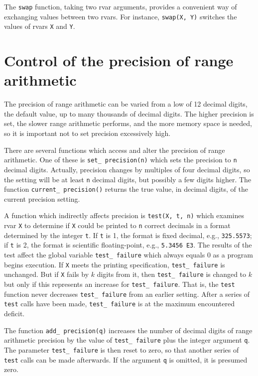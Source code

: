 The {\tt swap} function, taking two rvar arguments, provides a convenient
way of exchanging values between two rvars. For instance, {\tt swap(X, Y)}
switches the values of rvars {\tt X} and {\tt Y}.

\section{Control of the precision of range arithmetic}
The precision of range arithmetic can be varied from a low
of 12 decimal digits, the default value, up to many thousands of
decimal digits. The higher precision is set, the slower range arithmetic
performs, and the more memory space is needed, so
it is important not to set precision excessively high.

There are several functions which access and alter the precision of
range arithmetic. One of these is \hbox{\tt set\_ precision(n)} which sets
the precision to {\tt n} decimal digits. Actually, precision changes
by multiples of four decimal digits, so the setting will be at
least {\tt n} decimal digits, but possibly a few digits higher.
The function {\tt current\_ precision()} returns the true value,
in decimal digits, of the current precision setting.

A function which indirectly affects precision is
\hbox{\tt test(X, t, n)} which examines rvar {\tt X} to determine if
{\tt X} could be printed to {\tt n} correct decimals in a format
determined by the integer {\tt t}. If {\tt t} is 1, the format is
fixed decimal, e.g., \hbox{\tt 325.5573}; if {\tt t} is 2,
the format is scientific floating-point, e.g., \hbox{\tt 5.3456 E3}.
The results of the test affect the global variable \hbox{\tt test\_ failure}
which always equals 0 as a program begins execution. If {\tt X} meets
the printing specification, \hbox{\tt test\_ failure} is unchanged. 
But if {\tt X} fails by $k$ digits from it, then \hbox{\tt test\_ failure}
is changed to $k$ but only if this represents an increase for 
{\tt test\_ failure}. That is, the {\tt test} function never
decreases {\tt test\_ failure} from an earlier setting.
After a series of {\tt test} calls have been made, {\tt test\_ failure}
is at the maximum encountered deficit.

The function {\tt add\_ precision(q)} increases the number 
of decimal digits of range arithmetic precision by the value
of {\tt test\_ failure} plus the integer argument {\tt q}. The
parameter {\tt test\_ failure} is then reset to zero, so that another series
of {\tt test} calls can be made afterwards. If the argument {\tt q}  is omitted,
it is presumed zero.

